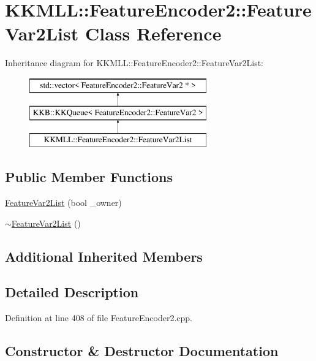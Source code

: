 \hypertarget{class_feature_encoder2_1_1_feature_var2_list}{}\section{K\+K\+M\+LL\+:\+:Feature\+Encoder2\+:\+:Feature\+Var2\+List Class Reference}
\label{class_feature_encoder2_1_1_feature_var2_list}
Inheritance diagram for K\+K\+M\+LL\+:\+:Feature\+Encoder2\+:\+:Feature\+Var2\+List\+:\begin{figure}[H]
\begin{center}
\leavevmode
\includegraphics[height=3.000000cm]{class_feature_encoder2_1_1_feature_var2_list}
\end{center}
\end{figure}
\subsection*{Public Member Functions}
\begin{DoxyCompactItemize}
\item 
\hyperlink{class_feature_encoder2_1_1_feature_var2_list_adca64895599c1a0a9a658e6e146218a4}{Feature\+Var2\+List} (bool \+\_\+owner)
\item 
\hyperlink{class_feature_encoder2_1_1_feature_var2_list_a24294335a9761aa93f22094001fab712}{$\sim$\+Feature\+Var2\+List} ()
\end{DoxyCompactItemize}
\subsection*{Additional Inherited Members}


\subsection{Detailed Description}


Definition at line 408 of file Feature\+Encoder2.\+cpp.



\subsection{Constructor \& Destructor Documentation}
